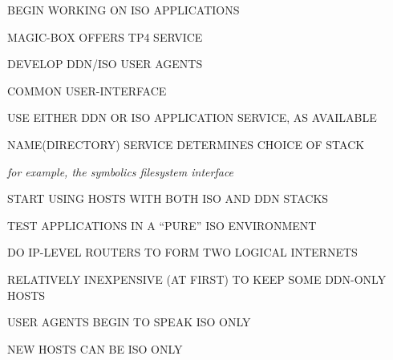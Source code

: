 \begin{bwslide}

\begin{nrtc}
\item	BEGIN WORKING ON ISO APPLICATIONS

\item	MAGIC-BOX OFFERS TP4 SERVICE

\item	DEVELOP DDN/ISO USER AGENTS
    \begin{nrtc}
    \item	COMMON USER-INTERFACE

    \item	USE EITHER DDN OR ISO APPLICATION SERVICE, AS AVAILABLE

    \item	NAME(DIRECTORY) SERVICE DETERMINES CHOICE OF STACK
    \end{nrtc}
\end{nrtc}
\end{bwslide}


\begin{note}\em
for example, the symbolics filesystem interface
\end{note}


\begin{bwslide}

\begin{nrtc}
\item	START USING HOSTS WITH BOTH ISO AND DDN STACKS

\item	TEST APPLICATIONS IN A ``PURE'' ISO ENVIRONMENT

\item	DO IP-LEVEL ROUTERS TO FORM TWO LOGICAL INTERNETS
\end{nrtc}
\end{bwslide}


\begin{bwslide}

\begin{nrtc}
\item	RELATIVELY INEXPENSIVE (AT FIRST) TO KEEP SOME DDN-ONLY HOSTS

\item	USER AGENTS BEGIN TO SPEAK ISO ONLY

\item	NEW HOSTS CAN BE ISO ONLY
\end{nrtc}
\end{bwslide}


